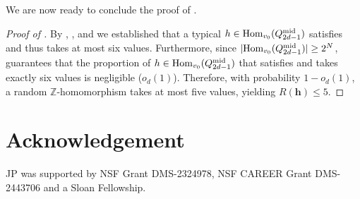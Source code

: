 \documentclass{amsart}
\theoremstyle{definition}
\newcommand{\ZZ}{\mathbb{Z}}
\newcommand{\md}{\mathrm{mid}}
\newcommand{\0}[0]{\emptyset}
\newcommand{\Hom}[0]{\mbox{\rm{Hom}}}
\begin{document}
We are now ready to conclude the proof of .

\begin{proof}[Proof of ]
By , , and  we established that a typical $h\in \Hom_{v_0}(Q_{2d-1}^{\md})$ satisfies  and thus takes at most six values. Furthermore, since $|\Hom_{v_0}(Q_{2d-1}^{\md})|\geq 2^N$,  guarantees that the proportion of $h\in \Hom_{v_0}(Q_{2d-1}^{\md})$ that satisfies  and takes exactly six values is negligible ($o_d(1)$). Therefore, with probability $1-o_d(1)$, a random $\ZZ$-homomorphism takes at most five values, yielding $R(\mathbf{h}) \le 5$. 
\end{proof}


    
\section*{Acknowledgement}

JP was supported by NSF Grant DMS-2324978, NSF CAREER Grant DMS-2443706 and a Sloan Fellowship.


\end{document}
